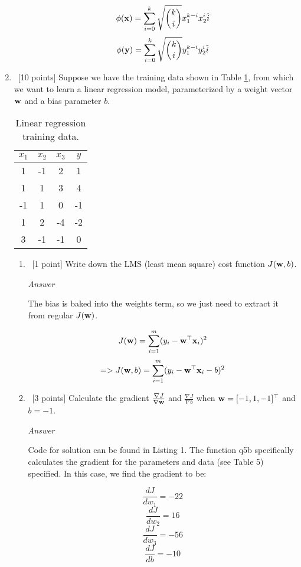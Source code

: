 \documentclass[12pt, fullpage,letterpaper]{article}
\begin{document}
\begin{enumerate}
\begin{enumerate}
        \[
            \phi({\bf x}) = \sum_{i=0}^k \sqrt{k \choose i} x_1^{k-i} x_2^{i} \hat{i}
        \]
        \[
            \phi({\bf y}) = \sum_{i=0}^k \sqrt{k \choose i} y_1^{k-i} y_2^{i} \hat{i}
        \]
		
	\end{enumerate}

\item~[10 points] Suppose we have the training data shown in Table \ref{tb:1}, from which we want to learn a linear regression model, parameterized by a weight vector ${\bf w}$ and a bias parameter $b$.  
\begin{table}
	\centering
	\begin{tabular}{ccc|c}
		$x_1 $ & $x_2$ & $x_3$ &  $y$\\ 
		\hline\hline
		1 & -1 & 2 & 1 \\ \hline
		1 & 1 & 3 & 4 \\ \hline
		-1 & 1 & 0 & -1 \\ \hline
		1 & 2 & -4 & -2 \\ \hline
		3 & -1 & -1 & 0\\ \hline
	\end{tabular}
	\caption{Linear regression training data.}\label{tb:1}
\end{table}

\begin{enumerate}
	\item~[1 point] Write down the LMS (least mean square) cost function $J({\bf w}, b)$.
	
	\emph{Answer}
	
	The bias is baked into the weights term, so we just need to extract it from regular $J({\bf w})$.
	
	\[
	    J({\bf w}) = \sum_{i=1}^m (y_i - {\bf w}^\top {\bf x}_i)^2
	\]
	\[
	    => J({\bf w}, b) = \sum_{i=1}^m (y_i - {\bf w}^\top {\bf x}_i - b)^2
	\]
	
	\item~[3 points] Calculate the gradient $\frac{\nabla J}{\nabla {\bf w}}$ and $\frac{\nabla J}{\nabla b}$ when ${\bf w} = [-1,1,-1]^\top$ and $b = -1$.
	
	\emph{Answer}
	
	Code for solution can be found in Listing 1. The function q5b specifically calculates the gradient for the parameters and data (see Table 5) specified. In this case, we find the gradient to be:
	
	\[
	\frac{dJ}{dw_1} = -22
	\]
	\[
    \frac{dJ}{dw_2} = 16
    \]
    \[
    \frac{dJ}{dw_3} = -56
    \]
    \[
    \frac{dJ}{db} = -10
    \]
	

\end{enumerate}
\end{enumerate}
\end{document}

